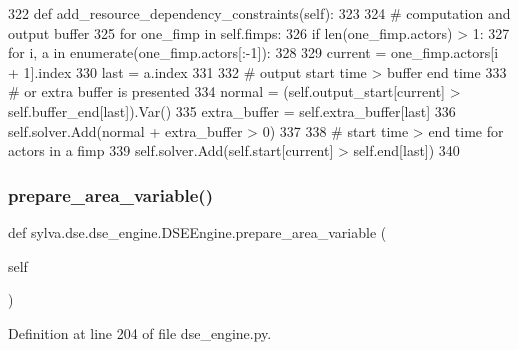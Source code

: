 \begin{DoxyCode}
322     \textcolor{keyword}{def }add\_resource\_dependency\_constraints(self):
323 
324         \textcolor{comment}{# computation and output buffer}
325         \textcolor{keywordflow}{for} one\_fimp \textcolor{keywordflow}{in} self.fimps:
326             \textcolor{keywordflow}{if} len(one\_fimp.actors) > 1:
327                 \textcolor{keywordflow}{for} i, a \textcolor{keywordflow}{in} enumerate(one\_fimp.actors[:-1]):
328 
329                     current = one\_fimp.actors[i + 1].index
330                     last = a.index
331 
332                     \textcolor{comment}{# output start time > buffer end time}
333                     \textcolor{comment}{# or extra buffer is presented}
334                     normal = (self.output\_start[current] > self.buffer\_end[last]).Var()
335                     extra\_buffer = self.extra\_buffer[last]
336                     self.solver.Add(normal + extra\_buffer > 0)
337 
338                     \textcolor{comment}{# start time > end time for actors in a fimp}
339                     self.solver.Add(self.start[current] > self.end[last])
340 
\end{DoxyCode}
\mbox{\label{classsylva_1_1dse_1_1dse__engine_1_1_d_s_e_engine_ace681eee5a37993f9cf735bcd023e9de}} 
\subsubsection{\texorpdfstring{prepare\+\_\+area\+\_\+variable()}{prepare\_area\_variable()}}
{\footnotesize\ttfamily def sylva.\+dse.\+dse\+\_\+engine.\+D\+S\+E\+Engine.\+prepare\+\_\+area\+\_\+variable (\begin{DoxyParamCaption}\item[{}]{self }\end{DoxyParamCaption})}



Definition at line 204 of file dse\+\_\+engine.\+py.


